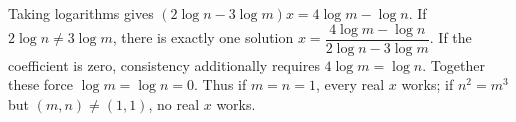 Taking logarithms gives $(2\log n-3\log m)x=4\log m-\log n$. If $2\log n\ne3\log m$, there is exactly one solution $\boxed{x=\dfrac{4\log m-\log n}{2\log n-3\log m}}$. If the coefficient is zero, consistency additionally requires $4\log m=\log n$. Together these force $\log m=\log n=0$. Thus if $m=n=1$, every real $x$ works; if $n^2=m^3$ but $(m,n)\ne(1,1)$, no real $x$ works.
